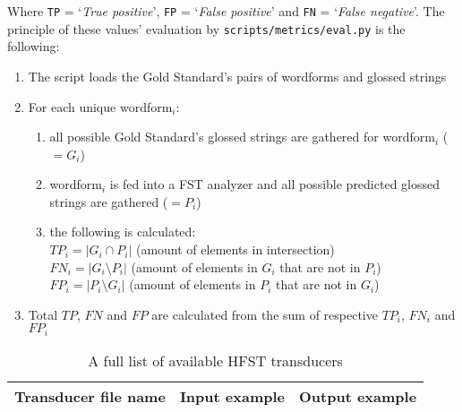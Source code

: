 Where \texttt{TP} = `\textit{True positive}', \texttt{FP} = `\textit{False positive}' and \texttt{FN} = `\textit{False negative}'. The principle of these values' evaluation by \texttt{scripts/metrics/eval.py} is the following: 
\begin{enumerate}
    \item The script loads the Gold Standard's pairs of wordforms and glossed strings
    \item For each unique wordform$_i$:
    \begin{enumerate}
        \item all possible Gold Standard's glossed strings are gathered for wordform$_i$ ($=G_i$)
        \item wordform$_i$ is fed into a FST analyzer and all possible predicted glossed strings are gathered ($=P_i$)
        \item the following is calculated: \\
        $TP_i = |G_i \cap P_i|$ (amount of elements in intersection)\\
        $FN_i = |G_i \setminus P_i|$ (amount of elements in $G_i$ that are not in $P_i$)\\
        $FP_i = |P_i \setminus G_i|$ (amount of elements in $P_i$ that are not in $G_i$)
    \end{enumerate}
    \item Total $TP$, $FN$ and $FP$ are calculated from the sum of respective $TP_i$, $FN_i$ and $FP_i$
\end{enumerate}

\begin{table}[!h]
    \begin{center}
        \begin{tabular}{|l|l|l|}
            \hline
            \textbf{Transducer file name} & \textbf{Input example} & \textbf{Output example} \\
            \hline
            \hline
        \end{tabular}
        \caption{A full list of available HFST transducers}
        \label{Tab:all_hfst}
    \end{center}
\end{table}
